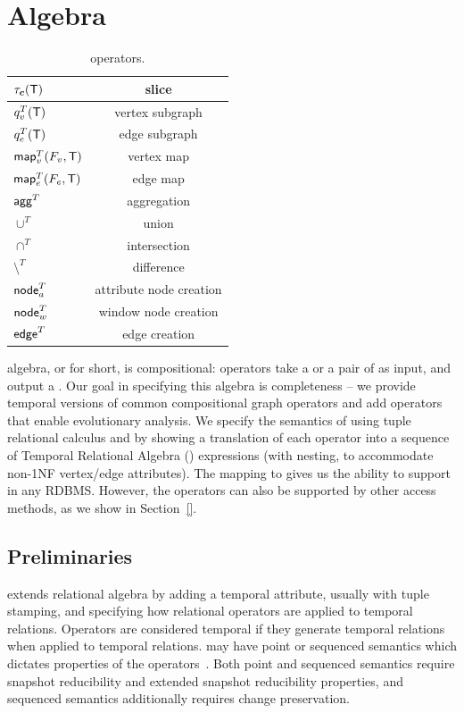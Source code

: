 \section{Algebra}
\label{sec:algebra}
\setlength{\textfloatsep}{5pt}%

\begin{table}
\caption{\tga operators.}
\small
\begin{tabular}{l | c}
\hline
$\tau_{\boldsymbol{c}}(\mathsf{T})$ & slice \\ \hline
$q^T_v(\mathsf{T})$ & vertex subgraph \\ \hline
$q^T_e(\mathsf{T})$ & edge subgraph \\ \hline
$\textsf{map}^T_v(F_v, \mathsf{T})$ & vertex map \\ \hline
$\textsf{map}^T_e(F_e, \mathsf{T})$ & edge map \\ \hline
$\textsf{agg}^T$ & aggregation \\ \hline
$\cup^T$ & union \\ \hline
$\cap^T$ & intersection \\ \hline
$\setminus^T$ & difference \\ \hline
$\textsf{node}^T_a$ & attribute node creation \\ \hline
$\textsf{node}^T_w$ & window node creation \\ \hline
$\textsf{edge}^T$ & edge creation \\ \hline
\end{tabular}
\label{tab:operators}
\end{table}

\tg algebra, or \tga for short, is compositional: operators take a \tg
or a pair of \tgs as input, and output a \tg.  Our goal in specifying
this algebra is completeness -- we provide temporal versions of common
compositional graph operators and add operators that enable
evolutionary analysis.  We specify the semantics of \tga using tuple
relational calculus and by showing a translation of each operator into
a sequence of Temporal Relational Algebra (\tra) expressions (with
nesting, to accommodate non-1NF vertex/edge attributes).  The mapping
to \tra gives us the ability to support \tga in any RDBMS.  However,
the \tga operators can also be supported by other access methods, as
we show in Section~\ref{}.

\subsection{Preliminaries}
\label{sec:algebra:tra}

\tra extends relational algebra by adding a temporal attribute,
usually with tuple stamping, and specifying how relational operators
are applied to temporal relations.  Operators are considered temporal
if they generate temporal relations when applied to temporal
relations.  \tra may have point or sequenced semantics which dictates
properties of the operators~\cite{Bohlen1998,Dignos2012}.  Both point
and sequenced semantics require snapshot reducibility and extended
snapshot reducibility properties, and sequenced semantics additionally
requires change preservation.


